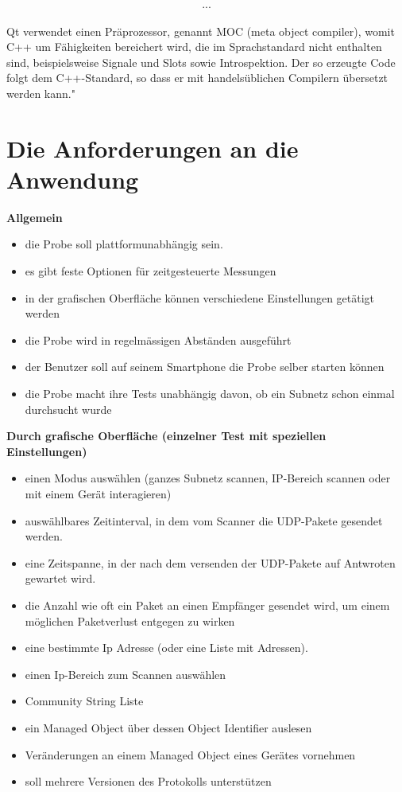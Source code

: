 \documentclass[11pt,a4paper]{article}
\begin{document}
\[...\]
\\
Qt verwendet einen Präprozessor, genannt MOC (meta object compiler), womit C++ um Fähigkeiten bereichert wird, die im Sprachstandard nicht enthalten sind, beispielsweise Signale und Slots sowie Introspektion. Der so erzeugte Code folgt dem C++-Standard, so dass er mit handelsüblichen Compilern übersetzt werden kann."
\cite{qtDescritionWikiPedia}\\

\section{Die Anforderungen an die Anwendung}
\textbf{Allgemein}
\begin{itemize}
\item die Probe soll plattformunabhängig sein.
\item es gibt feste Optionen für zeitgesteuerte Messungen
\item in der grafischen Oberfläche können verschiedene Einstellungen getätigt werden
\item die Probe wird in regelmässigen Abständen ausgeführt
\item der Benutzer soll auf seinem Smartphone die Probe selber starten können
\item die Probe macht ihre Tests unabhängig davon, ob ein Subnetz schon einmal durchsucht wurde
\end{itemize}

\textbf{Durch grafische Oberfläche (einzelner Test mit speziellen Einstellungen)}
\begin{itemize}
\item einen Modus auswählen (ganzes Subnetz scannen, IP-Bereich scannen oder mit einem Gerät interagieren)
\item auswählbares Zeitinterval, in dem vom Scanner die UDP-Pakete gesendet werden.
\item eine Zeitspanne, in der nach dem versenden der UDP-Pakete auf Antwroten gewartet wird.
\item die Anzahl wie oft ein Paket an einen Empfänger gesendet wird, um einem möglichen Paketverlust entgegen zu wirken
\item eine bestimmte Ip Adresse (oder eine Liste mit Adressen).
\item einen Ip-Bereich zum Scannen auswählen
\item Community String Liste
\item ein Managed Object über dessen Object Identifier auslesen
\item Veränderungen an einem Managed Object eines Gerätes vornehmen
\item soll mehrere Versionen des Protokolls unterstützen
\end{itemize}
\end{document}
